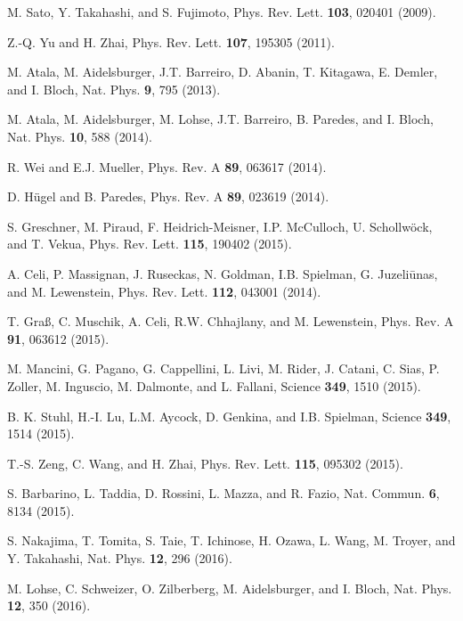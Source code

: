\documentclass[twocolumn,prl,superscriptaddress,amsmath,amssymb]{revtex4} %
\begin{document}
\begin{thebibliography}{10}
 M. Sato, Y. Takahashi, and S. Fujimoto, Phys. Rev. Lett. {\bf 103}, 020401 (2009).

 Z.-Q. Yu and H. Zhai, Phys. Rev. Lett. {\bf 107}, 195305 (2011).
%
%

 M. Atala, M. Aidelsburger, J.T. Barreiro, D. Abanin, T. Kitagawa, E. Demler, and I. Bloch, Nat. Phys. {\bf 9}, 795 (2013).

 M. Atala, M. Aidelsburger, M. Lohse, J.T. Barreiro, B. Paredes, and I. Bloch, Nat. Phys. {\bf10}, 588 (2014).

 R. Wei and E.J. Mueller, Phys. Rev. A {\bf 89}, 063617 (2014).

 D. H\"{u}gel and B. Paredes, Phys. Rev. A {\bf89}, 023619 (2014).

 S. Greschner, M. Piraud, F. Heidrich-Meisner, I.P. McCulloch, U. Schollw\"{o}ck, and T. Vekua, Phys. Rev. Lett. {\bf115}, 190402 (2015).

 A. Celi, P. Massignan, J. Ruseckas, N. Goldman, I.B. Spielman, G. Juzeli\={u}nas, and M. Lewenstein, Phys. Rev. Lett. {\bf112}, 043001 (2014).

 T. Gra{\ss}, C. Muschik, A. Celi, R.W. Chhajlany, and M. Lewenstein, Phys. Rev. A {\bf91}, 063612 (2015).

 M. Mancini, G. Pagano, G. Cappellini, L. Livi, M. Rider, J. Catani, C. Sias, P. Zoller, M. Inguscio, M. Dalmonte, and L. Fallani, Science {\bf349}, 1510 (2015).

  B. K. Stuhl, H.-I. Lu, L.M. Aycock, D. Genkina, and I.B. Spielman, Science {\bf349}, 1514 (2015).

 T.-S. Zeng, C. Wang, and H. Zhai, Phys. Rev. Lett. {\bf115}, 095302 (2015).

 S. Barbarino, L. Taddia, D. Rossini, L. Mazza, and R. Fazio, Nat. Commun. {\bf6}, 8134 (2015).

 S. Nakajima, T. Tomita, S. Taie, T. Ichinose, H. Ozawa, L. Wang, M. Troyer, and Y. Takahashi, Nat. Phys. {\bf 12}, 296 (2016).

 M. Lohse, C. Schweizer, O. Zilberberg, M. Aidelsburger, and I. Bloch, Nat. Phys. {\bf 12}, 350 (2016).


\end{thebibliography}
\end{document}
